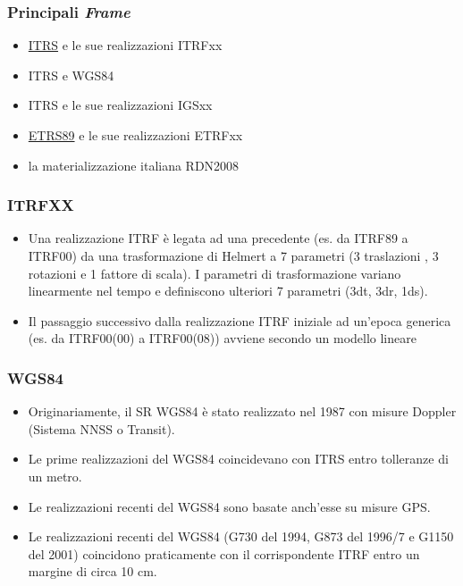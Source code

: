 \documentclass{beamer}
\begin{document}
{\begin{frame}
\begin{columns}
    \end{columns}

\end{frame}

\begin{frame}
	\frametitle{Principali \textit{Frame}}

	\begin{itemize}
		\item \href{https://www.iers.org}{ITRS} e le sue realizzazioni ITRFxx
		\item ITRS e WGS84
		\item ITRS e le sue realizzazioni IGSxx
		\item \href{http://www.euref.eu/euref_egrs.html}{ETRS89} e le sue realizzazioni ETRFxx
		\item la materializzazione italiana RDN2008
	\end{itemize}
\end{frame}

\begin{frame}
	\frametitle{ITRFXX}
	\begin{itemize}
		\item Una realizzazione ITRF è legata ad una precedente (es. da ITRF89 a ITRF00) da una 	trasformazione di Helmert a 7 parametri (3 traslazioni , 3 rotazioni e 1 fattore di scala).
        I parametri di trasformazione variano linearmente nel tempo e definiscono ulteriori 7 parametri (3dt, 3dr, 1ds).
		\item Il passaggio successivo dalla realizzazione ITRF iniziale ad un'epoca generica (es. da 	ITRF00(00) a ITRF00(08)) avviene secondo un modello lineare
	\end{itemize}

\end{frame}

\begin{frame}
	\frametitle{WGS84}
	\begin{itemize}
		\item Originariamente, il SR WGS84 è stato realizzato nel 1987 con misure Doppler (Sistema NNSS o Transit).
		\item Le prime realizzazioni del WGS84 coincidevano con ITRS entro tolleranze di un metro.
		\item Le realizzazioni recenti del WGS84 sono basate anch'esse su misure GPS.
		\item Le realizzazioni recenti del WGS84 (G730 del 1994, G873 del 1996/7 e G1150 del 2001) coincidono praticamente con il corrispondente ITRF entro un margine di circa 10 cm.
	\end{itemize}
	

\end{frame}}
\end{document}
